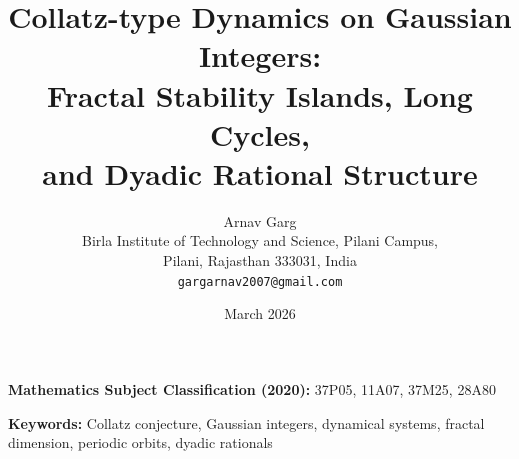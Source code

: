 \documentclass[12pt]{article}
\theoremstyle{plain}
\theoremstyle{definition}
\theoremstyle{remark}
\theoremstyle{definition}
\begin{document}

\title{Collatz-type Dynamics on Gaussian Integers:\\
       Fractal Stability Islands, Long Cycles,\\
       and Dyadic Rational Structure}

\author{Arnav Garg\\[4pt]
\small Birla Institute of Technology and Science, Pilani Campus,\\
\small Pilani, Rajasthan 333031, India\\[2pt]
\small \texttt{gargarnav2007@gmail.com}}

\date{March 2026}

\maketitle

\noindent\textbf{Mathematics Subject Classification (2020):}
37P05, 11A07, 37M25, 28A80

\medskip

\noindent\textbf{Keywords:} Collatz conjecture, Gaussian integers, dynamical
systems, fractal dimension, periodic orbits, dyadic rationals
\end{document}
